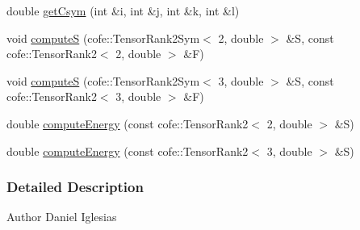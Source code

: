 \begin{DoxyCompactItemize}
\item 
double \hyperlink{classmknix_1_1_material_a457fa23b27193eb7b05f28cce48815c9}{get\-Csym} (int \&i, int \&j, int \&k, int \&l)
\item 
void \hyperlink{classmknix_1_1_material_a4659947ce09c0f9c02b61d8f7d37dec8}{compute\-S} (cofe\-::\-Tensor\-Rank2\-Sym$<$ 2, double $>$ \&S, const cofe\-::\-Tensor\-Rank2$<$ 2, double $>$ \&F)
\item 
void \hyperlink{classmknix_1_1_material_a837495b42050514f0c22513a05d438d8}{compute\-S} (cofe\-::\-Tensor\-Rank2\-Sym$<$ 3, double $>$ \&S, const cofe\-::\-Tensor\-Rank2$<$ 3, double $>$ \&F)
\item 
double \hyperlink{classmknix_1_1_material_a682b5ff79b4e899acb8d691aa01609c6}{compute\-Energy} (const cofe\-::\-Tensor\-Rank2$<$ 2, double $>$ \&S)
\item 
double \hyperlink{classmknix_1_1_material_a9183dec8b227f1a4ff6c45948a1523f8}{compute\-Energy} (const cofe\-::\-Tensor\-Rank2$<$ 3, double $>$ \&S)
\end{DoxyCompactItemize}


\subsubsection{Detailed Description}
\begin{DoxyAuthor}{Author}
Daniel Iglesias 
\end{DoxyAuthor}


